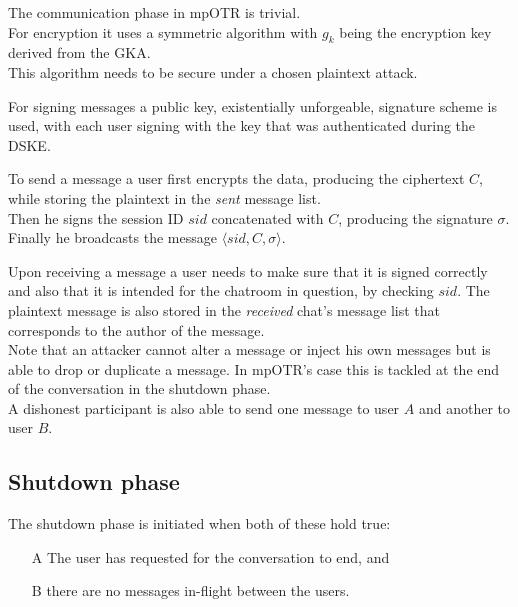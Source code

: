 \documentclass{beamer}
\begin{document}
\begin{frame}
The communication phase in mpOTR is trivial.\\[0.5cm]

For encryption it uses a symmetric algorithm with $g_k$ being the encryption key derived from the GKA.\\[0.5cm]

This algorithm needs to be secure under a chosen plaintext attack.
\end{frame}

\begin{frame}
For signing messages a public key, existentially unforgeable, signature scheme is used, with each user signing with the key that was authenticated during the DSKE.\\[0.5cm]


\end{frame}

\begin{frame}
To send a message a user first encrypts the data, producing the ciphertext $C$, while storing the plaintext in the \emph{sent} message list.\\[0.5cm]

Then he signs the session ID $sid$ concatenated with $C$, producing the signature $\sigma$.\\[0.5cm]

Finally he broadcasts the message $\langle sid, C, \sigma \rangle$.
\end{frame}

\begin{frame}
Upon receiving a message a user needs to make sure that it is signed correctly and also that it is intended for the chatroom in question, by checking $sid$. The plaintext message is also stored in the \emph{received} chat's message list that corresponds to the author of the message.\\[0.5cm]

Note that an attacker cannot alter a message or inject his own messages but is able to drop or duplicate a message. In mpOTR's case this is tackled at the end of the conversation in the shutdown phase.\\[0.5cm]

A dishonest participant is also able to send one message to user $A$ and another to user $B$.
\end{frame}


\subsection{Shutdown phase}
\begin{frame}
The shutdown phase is initiated when both of these hold true:

\begin{itemize}
\item[A] The user has requested for the conversation to end, and
\item[B] there are no messages in-flight between the users.
\end{itemize}
\end{frame}
\end{document}

